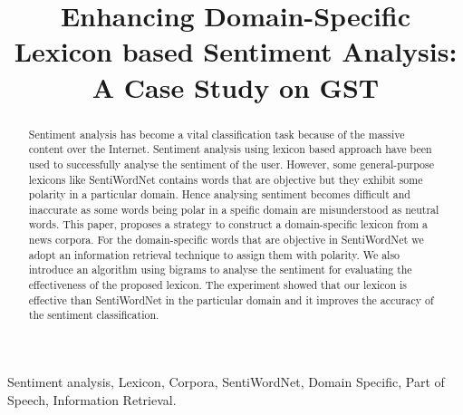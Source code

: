 \documentclass[conference]{IEEEtran}
\begin{document}
\title{Enhancing Domain-Specific Lexicon based Sentiment Analysis: A Case Study on GST\\
}

	\author{
	}

\maketitle

\begin{abstract}
Sentiment analysis has become a vital classification task because of the massive content over the Internet. Sentiment analysis using lexicon based approach  have been used to successfully analyse the sentiment of the user. However, some general-purpose lexicons like SentiWordNet contains words that are objective but they exhibit some polarity in a particular domain. Hence analysing sentiment becomes difficult and inaccurate as some words being polar in a speific domain are misunderstood as neutral words. This
paper, proposes a strategy to construct a domain-specific lexicon from a news corpora. For the domain-specific words that are objective in SentiWordNet  we adopt an information retrieval technique to assign them with polarity.	We also introduce an algorithm using bigrams to analyse the sentiment for evaluating the effectiveness of the proposed lexicon.  The experiment showed that our lexicon is effective than SentiWordNet in the particular domain and it improves the accuracy of the sentiment classification.
\end{abstract}

\begin{IEEEkeywords}
Sentiment analysis, Lexicon, Corpora, SentiWordNet, Domain Specific, Part of Speech, Information Retrieval.
\end{IEEEkeywords}
\end{document}
